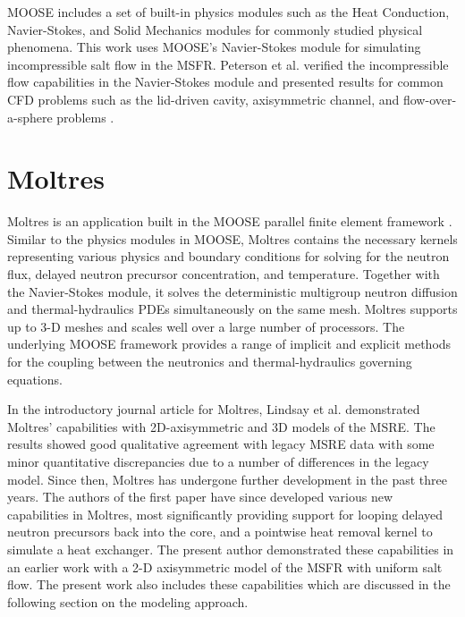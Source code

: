 \gls{MOOSE} includes a set of built-in physics modules such as the Heat
Conduction, Navier-Stokes, and Solid Mechanics modules for commonly studied
physical phenomena. This
work uses \gls{MOOSE}'s Navier-Stokes module for simulating
incompressible salt flow in the \gls{MSFR}. Peterson et al. verified the
incompressible flow capabilities in the
Navier-Stokes module and presented results for common \gls{CFD} problems such
as the lid-driven cavity, axisymmetric channel, and flow-over-a-sphere
problems \cite{peterson_overview_2017}. 

\section{Moltres}

Moltres is an application built in the \gls{MOOSE} parallel finite element
framework \cite{lindsay_introduction_2018}. Similar to the physics modules in
\gls{MOOSE}, Moltres contains the necessary kernels representing various
physics and boundary conditions for solving for the neutron flux, delayed
neutron precursor concentration, and temperature. Together with the
Navier-Stokes module, it solves
the deterministic multigroup neutron diffusion and thermal-hydraulics
\glspl{PDE} simultaneously on the same mesh. Moltres supports up to 3-D meshes
and scales well over a large number of processors. The underlying \gls{MOOSE}
framework provides a range of implicit and explicit methods for the coupling
between the neutronics and thermal-hydraulics governing equations.

In the introductory journal article for Moltres, Lindsay et al.
\cite{lindsay_introduction_2018} demonstrated Moltres' capabilities with
2D-axisymmetric and 3D models of the \gls{MSRE}. The results showed good
qualitative agreement with legacy \gls{MSRE} data with some minor
quantitative discrepancies due to a number of differences in the legacy model. 
Since then, Moltres has undergone further development in the past three years.
The authors of the first paper have since developed various new capabilities
in Moltres, most significantly providing support for looping delayed neutron
precursors back into the core, and a pointwise heat removal kernel to simulate
a heat exchanger. The present author demonstrated these capabilities in an
earlier work \cite{park_safety_2019} with a 2-D axisymmetric model of the
\gls{MSFR} with uniform salt flow. The present work also includes these
capabilities which are discussed in the following section on the modeling
approach.

